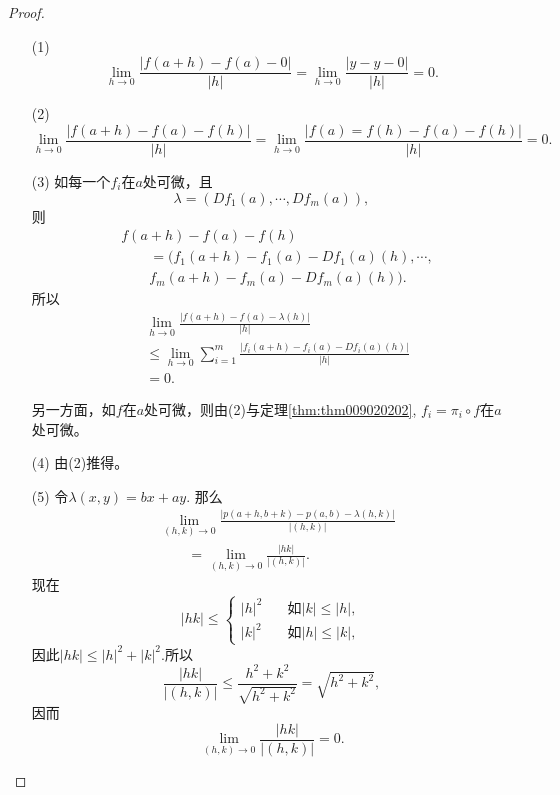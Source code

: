 \begin{proof}
\begin{enumerate}
\item[(1)]
\[
\lim_{h \to 0}{\frac{|f(a + h) - f(a) - 0|}{|h|}} = \lim_{h \to 0}{\frac{|y - y - 0|}{|h|}} = 0.
\] 

\item[(2)]
\[
\lim_{h \to 0}{\frac{|f(a + h) - f(a) - f(h)|}{|h|}} = \lim_{h \to 0}{\frac{|f(a) = f(h) - f(a) - f(h)|}{|h|}} = 0.
\]

\item[(3)]如每一个$f_i$在$a$处可微，且
\[
\lambda = (Df_1(a), \cdots, Df_m(a)),
\]
则
\[
\begin{aligned}
& f(a + h) - f(a) - f(h) \\
&\qquad = (f_1(a + h) - f_1(a) - Df_1(a)(h), \cdots, \\
&\qquad f_m(a+h) - f_m(a) - Df_m(a)(h)).
\end{aligned}
\]
所以
\[
\begin{aligned}
&\lim_{h \to 0}{\frac{|f(a + h) - f(a) - \lambda(h)|}{|h|}}\\
&\le \lim_{h \to 0}{\sum_{i=1}^{m}{\frac{|f_i(a+h) - f_i(a) - Df_i(a)(h)|}{|h|}}}\\
&=0.
\end{aligned}
\]

另一方面，如$f$在$a$处可微，则由(2)与定理\ref{thm:thm009020202}, $f_i = \pi_i\circ f$在$a$处可微。

\item[(4)]由(2)推得。

\item[(5)]令$\lambda(x, y) = bx + ay$. 那么
\[
\begin{aligned}
&\lim_{(h, k) \to 0}{\frac{|p(a +h, b+k) - p(a, b) - \lambda(h, k)|}{|(h, k)|}}\\
&\qquad=\lim_{(h, k) \to 0}{\frac{|hk|}{|(h, k)|}}.
\end{aligned}
\]
现在
\[
|hk| \le \left\{
\begin{aligned}
|h|^2 &\quad\text{如}|k| \le |h|,\\
|k|^2 &\quad\text{如}|h| \le |k|,
\end{aligned}
\right.
\]
因此$|hk| \le |h|^2 + |k|^2$.所以
\[
\frac{|hk|}{|(h,k)|} \le \frac{h^2 + k^2}{\sqrt{h^2 + k^2}} = \sqrt{h^2 + k^2},
\]
因而
\[
\lim_{(h, k) \to 0}{\frac{|hk|}{|(h, k)|}} = 0.
\]

\end{enumerate}
\end{proof}

